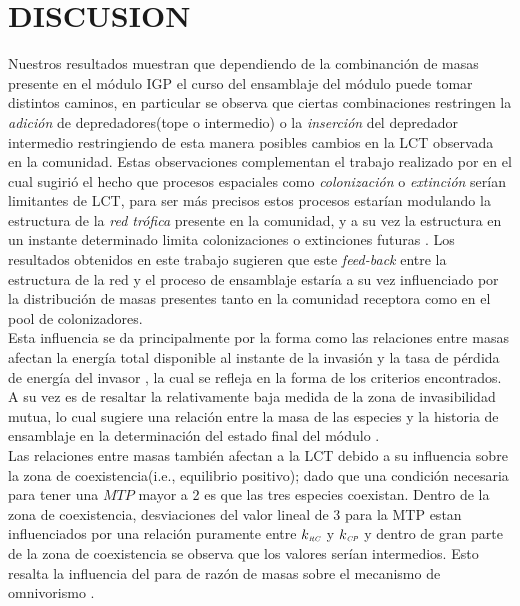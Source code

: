 \section{DISCUSION}

Nuestros resultados muestran que dependiendo de la combinanci\'on de masas presente en el m\'odulo IGP el curso del ensamblaje del m\'odulo puede tomar distintos caminos, en particular se observa que ciertas combinaciones restringen la \emph{adici\'on} de depredadores(tope o intermedio) o la \emph{inserci\'on} del depredador intermedio restringiendo de esta manera posibles cambios en la LCT observada en la comunidad\citep{TP2007proximate}. Estas observaciones complementan el trabajo realizado por \citet{holt2002food} en el cual sugiri\'o el hecho que procesos espaciales como \emph{colonizaci\'on} o \emph{extinci\'on} ser\'ian limitantes de LCT, para ser m\'as precisos estos procesos estar\'ian modulando la estructura de la \emph{red tr\'ofica} presente en la comunidad, y a su vez la estructura en un instante determinado limita colonizaciones o extinciones futuras \citep{pawar2009community,holt2002food}. Los resultados obtenidos en este trabajo sugieren que este \emph{feed-back} entre la estructura de la red y el proceso de ensamblaje estar\'ia a su vez influenciado por la distribuci\'on de masas presentes tanto en la comunidad receptora como en el pool de colonizadores.\\

Esta influencia se da principalmente por la forma como las relaciones entre masas afectan la energ\'ia total disponible al instante de la invasi\'on y la tasa de p\'erdida de energ\'ia del invasor \citep{pawar2012dimensionality}, la cual se refleja en la forma de los criterios encontrados. A su vez es de resaltar la relativamente baja medida de la zona de invasibilidad mutua, lo cual sugiere una relaci\'on entre la masa de las especies y la historia de ensamblaje en la determinaci\'on del estado final del m\'odulo \citep{fukami2004}.\\

Las relaciones entre masas tambi\'en afectan a la LCT debido a su influencia sobre la zona de coexistencia(i.e., equilibrio positivo); dado que una condici\'on necesaria para tener una $MTP$ mayor a 2 es que las tres especies coexistan. Dentro de la zona de coexistencia, desviaciones del valor lineal de $3$ para la MTP estan influenciados por una relaci\'on puramente entre $k_{\textit{\tiny RC}}$ y $k_{\textit{\tiny CP}}$ y dentro de gran parte de la zona de coexistencia se observa que los valores ser\'ian intermedios. Esto resalta la influencia del para de raz\'on de masas sobre el mecanismo de omnivorismo \citet{TP2007proximate}. \\

